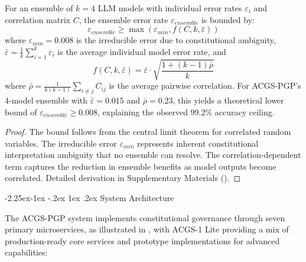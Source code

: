 \documentclass[manuscript,screen,9pt]{acmart}
\makeatletter
\renewcommand\subsection{\@startsection{subsection}{2}{\z@}%
  {-2.25ex\@plus -1ex \@minus -.2ex}%
  {1ex \@plus .2ex}%
  {\normalfont\large\bfseries}}
\makeatother
\begin{document}
\begin{theorem}
\label{thm:consensus_bounds}
For an ensemble of $k=4$ LLM models with individual error rates $\varepsilon_i$ and correlation matrix $C$, the ensemble error rate $\varepsilon_{ensemble}$ is bounded by:
\begin{equation}
\varepsilon_{ensemble} \geq \max(\varepsilon_{min}, f(C, k, \bar{\varepsilon}))
\end{equation}
where $\varepsilon_{min} = 0.008$ is the irreducible error due to constitutional ambiguity, $\bar{\varepsilon} = \frac{1}{k}\sum_{i=1}^{k}\varepsilon_i$ is the average individual model error rate, and 
\begin{equation}
f(C, k, \bar{\varepsilon}) = \bar{\varepsilon} \cdot \sqrt{\frac{1 + (k-1)\bar{\rho}}{k}}
\end{equation}
where $\bar{\rho} = \frac{1}{k(k-1)}\sum_{i \neq j} C_{ij}$ is the average pairwise correlation. For ACGS-PGP's 4-model ensemble with $\bar{\varepsilon} = 0.015$ and $\bar{\rho} = 0.23$, this yields a theoretical lower bound of $\varepsilon_{ensemble} \geq 0.008$, explaining the observed 99.2\% accuracy ceiling.
\end{theorem}
\begin{proof}
The bound follows from the central limit theorem for correlated random variables. The irreducible error $\varepsilon_{min}$ represents inherent constitutional interpretation ambiguity that no ensemble can resolve. The correlation-dependent term captures the reduction in ensemble benefits as model outputs become correlated. Detailed derivation in Supplementary Materials ().
\end{proof}

\subsection{System Architecture}
\label{subsec:system_architecture}

The ACGS-PGP system implements constitutional governance through seven primary microservices, as illustrated in , with ACGS-1 Lite providing a mix of production-ready core services and prototype implementations for advanced capabilities:
\end{document}
